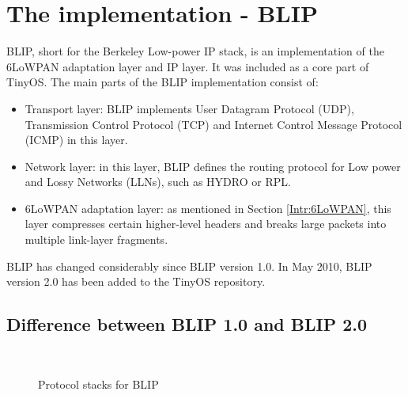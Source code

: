 \section{The implementation - BLIP}
\label{Blip}
BLIP, short for the Berkeley Low-power IP stack, is an implementation of the 6LoWPAN adaptation layer and IP layer. It was included as a core part of TinyOS. The main parts of the BLIP implementation consist of:
\begin{itemize}
\item Transport layer: BLIP implements User Datagram Protocol (UDP), Transmission Control Protocol (TCP) and Internet Control Message Protocol (ICMP) in this layer.

\item Network layer: in this layer, BLIP defines the routing protocol for Low power and Lossy Networks (LLNs), such as HYDRO or RPL.

\item 6LoWPAN adaptation layer: as mentioned in Section \ref{Intr:6LoWPAN}, this layer compresses certain higher-level headers and breaks large packets into multiple link-layer fragments.
\end{itemize}

BLIP has changed considerably since BLIP version 1.0. In May 2010, BLIP version 2.0 has been added to the TinyOS repository.
\subsection{Difference between BLIP 1.0 and BLIP 2.0}
\label{Blip:1.0-2.0}

\begin{figure}[htbp]
  \begin{center}
    \leavevmode
    \\
    \caption{Protocol stacks for BLIP}
    \label{fig:blip}
  \end{center}
\end{figure}

